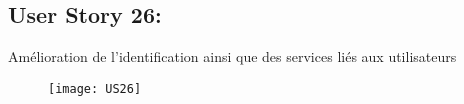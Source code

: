 \newpage
\subsection{User Story 26:}
Amélioration  de l'identification ainsi que des services liés aux utilisateurs


\begin{figure}[!h]
  \begin{center}
        \texttt{[image: US26]}
        \label{US26-dia}
  \end{center}
\end{figure}

